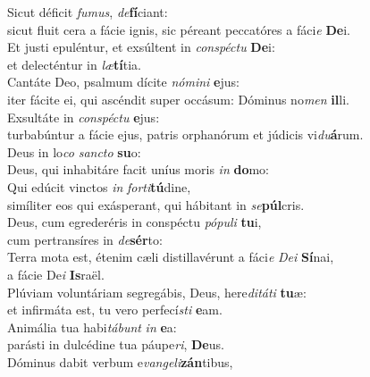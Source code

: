 \evenverse Sicut déficit \textit{fu}\textit{mus}, \textit{de}\textbf{fí}ciant:~\*\\
\evenverse sicut fluit cera a fácie ignis, sic péreant peccatóres a fáci\textit{e} \textbf{De}i.\\
\oddverse Et justi epuléntur, et exsúltent in \textit{con}\textit{spé}\textit{ctu} \textbf{De}i:~\*\\
\oddverse et delecténtur in \textit{læ}\textbf{tí}tia.\\
\evenverse Cantáte Deo, psalmum dícite \textit{nó}\textit{mi}\textit{ni} \textbf{e}jus:~\*\\
\evenverse iter fácite ei, qui ascéndit super occásum: Dóminus no\textit{men} \textbf{il}li.\\
\oddverse Exsultáte in \textit{con}\textit{spé}\textit{ctu} \textbf{e}jus:~\*\\
\oddverse turbabúntur a fácie ejus, patris orphanórum et júdicis vi\textit{du}\textbf{á}rum.\\
\evenverse Deus in lo\textit{co} \textit{san}\textit{cto} \textbf{su}o:~\*\\
\evenverse Deus, qui inhabitáre facit uníus moris \textit{in} \textbf{do}mo:\\
\oddverse Qui edúcit vinctos \textit{in} \textit{for}\textit{ti}\textbf{tú}dine,~\*\\
\oddverse simíliter eos qui exásperant, qui hábitant in \textit{se}\textbf{púl}cris.\\
\evenverse Deus, cum egrederéris in conspéctu \textit{pó}\textit{pu}\textit{li} \textbf{tu}i,~\*\\
\evenverse cum pertransíres in \textit{de}\textbf{sér}to:\\
\oddverse Terra mota est, étenim cæli distillavérunt a fáci\textit{e} \textit{De}\textit{i} \textbf{Sí}nai,~\*\\
\oddverse a fácie De\textit{i} \textbf{Is}raël.\\
\evenverse Plúviam voluntáriam segregábis, Deus, here\textit{di}\textit{tá}\textit{ti} \textbf{tu}æ:~\*\\
\evenverse et infirmáta est, tu vero perfecí\textit{sti} \textbf{e}am.\\
\oddverse Animália tua habi\textit{tá}\textit{bunt} \textit{in} \textbf{e}a:~\*\\
\oddverse parásti in dulcédine tua páupe\textit{ri}, \textbf{De}us.\\
\evenverse Dóminus dabit verbum e\textit{van}\textit{ge}\textit{li}\textbf{zán}tibus,~\*\\
